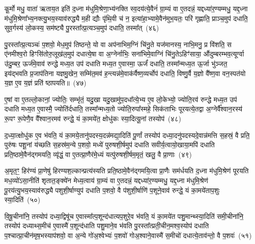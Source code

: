 कू॒र्मो मधु॒ वाता॑ ऋताय॒त इति॑ द॒ध्ना म॑धुमि॒श्रेणा॒भ्य॑नक्ति स्व॒दय॑त्ये॒वैनं॑ ग्रा॒म्यं वा ए॒तदन्नं॒ यद्दध्या॑र॒ण्यम्मधु॒ यद्द॒ध्ना म॑धुमि॒श्रेणा᳚भ्य॒नक्त्यु॒भय॒स्याव॑रुद्ध्यै म॒ही द्यौः पृ॑थि॒वी च॑ न॒ इत्या॑हा॒भ्यामे॒वैन॑मुभ॒यतः॒ परि॑ गृह्णाति॒ प्राञ्च॒मुप॑ दधाति॒ सुव॒र्गस्य॑ लो॒कस्य॒ सम॑ष्ट्यै पु॒रस्ता᳚त्प्र॒त्यञ्च॒मुप॑ दधाति॒ तस्मा᳚त्~(४६)

पु॒रस्ता᳚त्प्र॒त्यञ्चः॑ प॒शवो॒ मेध॒मुप॑ तिष्ठन्ते॒ यो वा अप॑नाभिम॒ग्निं चि॑नु॒ते यज॑मानस्य॒ नाभि॒मनु॒ प्र वि॑शति॒ स ए॑नमीश्व॒रो हिꣳसि॑तोरु॒लूख॑ल॒मुप॑ दधात्ये॒षा वा अ॒ग्नेर्नाभिः॒ सना॑भिमे॒वाग्निं चि॑नु॒ते\-ऽहिꣳ॑साया॒ औ॑दुम्बरम्भव॒त्यूर्ग्वा उ॑दु॒म्बर॒ ऊर्ज॑मे॒वाव॑ रुन्द्धे मध्य॒त उप॑ दधाति मध्य॒त ए॒वास्मा॒ ऊर्जं॑ दधाति॒ तस्मा᳚न्मध्य॒त ऊ॒र्जा भु॑ञ्जत॒ इय॑द्भवति प्र॒जाप॑तिना यज्ञमु॒खेन॒ सम्मि॑त॒मव॑ ह॒न्त्यन्न॑मे॒वाक॑र्वैष्ण॒व्यर्चोप॑ दधाति॒ विष्णु॒र्वै य॒ज्ञो वै᳚ष्ण॒वा वन॒स्पत॑यो य॒ज्ञ ए॒व य॒ज्ञं प्रति॑ ष्ठापयति॥~(४७)

{\anuvakamend[{ए॒ष वै प॒शुर्यम॑सर्पदे॒ष यत्तस्मा॒त्तस्मा᳚थ्स॒प्तविꣳ॑शतिश्च}]}%

ए॒षां वा ए॒तल्लो॒कानां॒ ज्योतिः॒ सम्भृ॑तं॒ यदु॒खा यदु॒खामु॑प॒दधा᳚त्ये॒भ्य ए॒व लो॒केभ्यो॒ ज्योति॒रव॑ रुन्द्धे मध्य॒त उप॑ दधाति मध्य॒त ए॒वास्मै॒ ज्योति॑र्दधाति॒ तस्मा᳚न्मध्य॒तो ज्योति॒रुपा᳚स्महे॒ सिक॑ताभिः पूरयत्ये॒तद्वा अ॒ग्नेर्वै᳚श्वान॒रस्य॑ रू॒पꣳ रू॒पेणै॒व वै᳚श्वान॒रमव॑ रुन्द्धे॒ यं का॒मये॑त॒ क्षोधु॑कः स्या॒दित्यू॒नां तस्योप॑~(४८)

द॒ध्या॒त्क्षोधु॑क ए॒व भ॑वति॒ यं का॒मये॒तानु॑पदस्य॒दन्न॑मद्या॒दिति॑ पू॒र्णां तस्योप॑ दध्या॒दनु॑पदस्यदे॒वान्न॑मत्ति स॒हस्रं॒ वै प्रति॒ पुरु॑षः पशू॒नां य॑च्छति स॒हस्र॑म॒न्ये प॒शवो॒ मध्ये॑ पुरुषशी॒र्\mbox{}षमुप॑ दधाति सवीर्य॒त्वायो॒खाया॒मपि॑ दधाति प्रति॒ष्ठामे॒वैन॑द्गमयति॒ व्यृ॑द्धं॒ वा ए॒तत्प्रा॒णैर॑मे॒ध्यं यत्पु॑रुषशी॒र्\mbox{}षम॒मृतं॒ खलु॒ वै प्रा॒णाः~(४९)

अ॒मृत॒ꣳ॒ हिर॑ण्यं प्रा॒णेषु॑ हिरण्यश॒ल्कान्प्रत्य॑स्यति प्रति॒ष्ठामे॒वैन॑द्गमयि॒त्वा प्रा॒णैः सम॑र्धयति द॒ध्ना म॑धुमि॒श्रेण॑ पूरयति मध॒व्यो॑\-ऽसा॒नीति॑ शृतात॒ङ्क्ये॑न मेध्य॒त्वाय॑ ग्रा॒म्यं वा ए॒तदन्नं॒ यद्दध्या॑र॒ण्यम्मधु॒ यद्द॒ध्ना म॑धुमि॒श्रेण॑ पू॒रय॑त्यु॒भय॒स्याव॑रुद्ध्यै पशुशी॒र्\mbox{}षाण्युप॑ दधाति प॒शवो॒ वै प॑शुशी॒र्\mbox{}षाणि॑ प॒शूने॒वाव॑ रुन्द्धे॒ यं का॒मये॑ताप॒शुः स्या॒दिति॑~(५०)

वि॒षू॒चीना॑नि॒ तस्योप॑ दध्या॒द्विषू॑च ए॒वास्मा᳚त्प॒शून्द॑धात्यप॒शुरे॒व भ॑वति॒ यं का॒मये॑त पशु॒मान्थ्स्या॒दिति॑ समी॒चीना॑नि॒ तस्योप॑ दध्याथ्स॒मीच॑ ए॒वास्मै॑ प॒शून्द॑धाति पशु॒माने॒व भ॑वति पु॒रस्ता᳚त्प्रती॒चीन॒मश्व॒स्योप॑ दधाति प॒श्चात्प्रा॒चीन॑मृष॒भस्याप॑शवो॒ वा अ॒न्ये गो॑अ॒श्वेभ्यः॑ प॒शवो॑ गोअ॒श्वाने॒वास्मै॑ स॒मीचो॑ दधात्ये॒ताव॑न्तो॒ वै प॒शवः॑~(५१)

